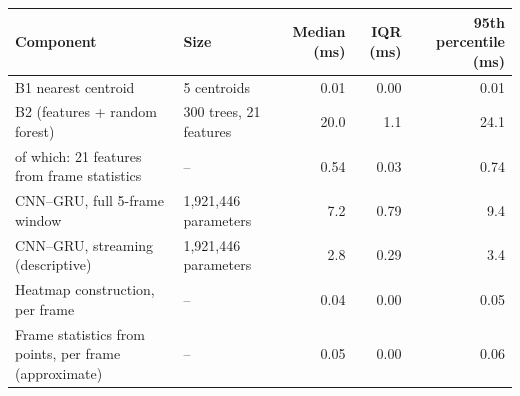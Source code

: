 \begin{tabular}{@{}llrrr@{}}
\toprule
Component & Size & Median (ms) & IQR (ms) & 95th percentile (ms) \\
\midrule
B1 nearest centroid & 5 centroids & 0.01 & 0.00 & 0.01 \\ %
B2 (features + random forest) & 300 trees, 21 features & 20.0 & 1.1 & 24.1 \\ %
\quad of which: 21 features from frame statistics & -- & 0.54 & 0.03 & 0.74 \\ %
CNN--GRU, full 5-frame window & 1{,}921{,}446 parameters & 7.2 & 0.79 & 9.4 \\ %
CNN--GRU, streaming (descriptive) & 1{,}921{,}446 parameters & 2.8 & 0.29 & 3.4 \\ %
Heatmap construction, per frame & -- & 0.04 & 0.00 & 0.05 \\ %
Frame statistics from points, per frame (approximate) & -- & 0.05 & 0.00 & 0.06 \\ %
\bottomrule
\end{tabular}
